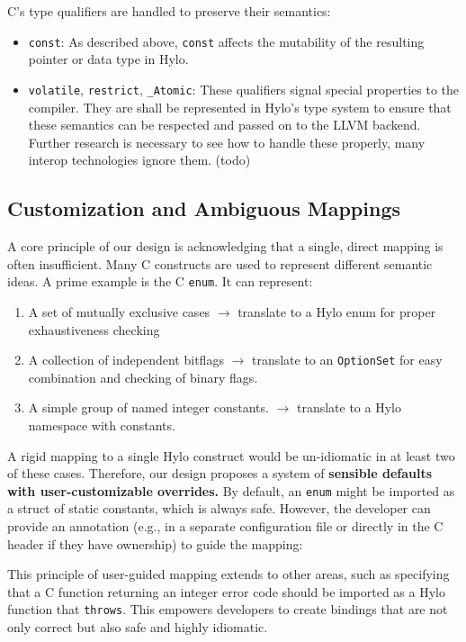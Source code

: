 C's type qualifiers are handled to preserve their semantics:
\begin{itemize}
    \item \texttt{const}: As described above, \texttt{const} affects the mutability of the resulting pointer or data type in Hylo.
    \item \texttt{volatile}, \texttt{restrict}, \texttt{\_Atomic}: These qualifiers signal special properties to the compiler. They are shall be represented in Hylo's type system to ensure that these semantics can be respected and passed on to the LLVM backend. Further research is necessary to see how to handle these properly, many interop technologies ignore them. (todo)   
\end{itemize}

\subsection{Customization and Ambiguous Mappings}

A core principle of our design is acknowledging that a single, direct mapping is often insufficient. Many C constructs are used to represent different semantic ideas. A prime example is the C \texttt{enum}. It can represent:
\begin{enumerate}
    \item A set of mutually exclusive cases \(\rightarrow\) translate to a Hylo enum for proper exhaustiveness checking
    \item A collection of independent bitflags \(\rightarrow\) translate to an \texttt{OptionSet} \cite{optionset} for easy combination and checking of binary flags.
    \item A simple group of named integer constants. \(\rightarrow\) translate to a Hylo namespace with constants.
\end{enumerate}
A rigid mapping to a single Hylo construct would be un-idiomatic in at least two of these cases. Therefore, our design proposes a system of \textbf{sensible defaults with user-customizable overrides.} By default, an \texttt{enum} might be imported as a struct of static constants, which is always safe. However, the developer can provide an annotation (e.g., in a separate configuration file or directly in the C header if they have ownership) to guide the mapping:

This principle of user-guided mapping extends to other areas, such as specifying that a C function returning an integer error code should be imported as a Hylo function that \texttt{throws}. This empowers developers to create bindings that are not only correct but also safe and highly idiomatic.
